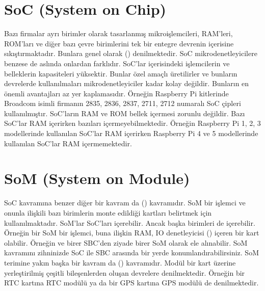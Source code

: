\documentclass[letterpaper,10pt,turkish]{sphinxmanual}
\begin{document}
\section{SoC (System on Chip)}
\label{\detokenize{introduction:soc-system-on-chip}}
\sphinxAtStartPar
Bazı firmalar ayrı birimler olarak tasarlanmış mikroişlemcileri, RAM’leri, ROM’ları ve diğer bazı
çevre birimlerini tek bir entegre devrenin içerisine sıkıştırmaktadır. Bunlara genel olarak
 () denilmektedir. SoC mikrodenetleyicilere benzese de aslında onlardan
farklıdır. SoC’lar içerisindeki işlemcilerin ve belleklerin kapasiteleri yüksektir. Bunlar özel
amaçlı üretilirler ve bunların devrelerde kullanılmaları mikrodenetleyiciler kadar kolay değildir.
Bunların en önemli avantajları az yer kaplamasıdır. Örneğin Raspberry Pi kitlerinde Broadcom
isimli firmanın 2835, 2836, 2837, 2711, 2712 numaralı SoC çipleri kullanılmıştır. SoC’ların RAM
ve ROM bellek içermesi zorunlu değildir. Bazı SoC’lar RAM içerirken bazıları içermeyebilmektedir.
Örneğin Raspberry Pi 1, 2, 3 modellerinde kullanılan SoC’lar RAM içerirken Raspberry Pi 4 ve 5
modellerinde kullanılan SoC’lar RAM içermemektedir.


\section{SoM (System on Module)}
\label{\detokenize{introduction:som-system-on-module}}
\sphinxAtStartPar
SoC kavramına benzer diğer bir kavram da  () kavramıdır. SoM bir işlemci
ve onunla ilişkili bazı birimlerin monte edildiği kartları belirtmek için kullanılmaktadır. SoM’lar
SoC’ları içerebilir. Ancak başka birimleri de içerebilir. Örneğin bir SoM bir işlemci, buna ilişkin
RAM, IO denetleyicisi () içeren bir kart olabilir. Örneğin  ve
 birer SBC’den ziyade birer SoM olarak ele alınabilir. SoM kavramını
zihninizde SoC ile SBC arasında bir yerde konumlandırabilirsiniz. SoM terimine yakın başka bir
kavram da  () kavramıdır. Modül bir kart üzerine yerleştirilmiş çeşitli
bileşenlerden oluşan devrelere denilmektedir. Örneğin bir RTC kartına RTC modülü ya da bir GPS
kartına GPS modülü de denilmektedir.
\end{document}
